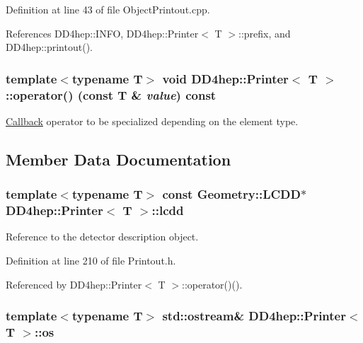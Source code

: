 Definition at line 43 of file ObjectPrintout.cpp.

References DD4hep::INFO, DD4hep::Printer$<$ T $>$::prefix, and DD4hep::printout().\hypertarget{struct_d_d4hep_1_1_printer_a8612eda65f4491a0e5d45e235ca09359}{
\subsubsection[{operator()}]{\setlength{\rightskip}{0pt plus 5cm}template$<$typename T$>$ void {\bf DD4hep::Printer}$<$ {\bf T} $>$::operator() (const {\bf T} \& {\em value}) const}}
\label{struct_d_d4hep_1_1_printer_a8612eda65f4491a0e5d45e235ca09359}


\hyperlink{class_d_d4hep_1_1_callback}{Callback} operator to be specialized depending on the element type. 

\subsection{Member Data Documentation}
\hypertarget{struct_d_d4hep_1_1_printer_a09e1761c59664ca7953a3bead1f44dd4}{
\subsubsection[{lcdd}]{\setlength{\rightskip}{0pt plus 5cm}template$<$typename T$>$ const {\bf Geometry::LCDD}$\ast$ {\bf DD4hep::Printer}$<$ {\bf T} $>$::{\bf lcdd}}}
\label{struct_d_d4hep_1_1_printer_a09e1761c59664ca7953a3bead1f44dd4}


Reference to the detector description object. 

Definition at line 210 of file Printout.h.

Referenced by DD4hep::Printer$<$ T $>$::operator()().\hypertarget{struct_d_d4hep_1_1_printer_a1ec1ad8ef8150a32854541bec0f9d7c8}{
\subsubsection[{os}]{\setlength{\rightskip}{0pt plus 5cm}template$<$typename T$>$ std::ostream\& {\bf DD4hep::Printer}$<$ {\bf T} $>$::{\bf os}}}
\label{struct_d_d4hep_1_1_printer_a1ec1ad8ef8150a32854541bec0f9d7c8}


